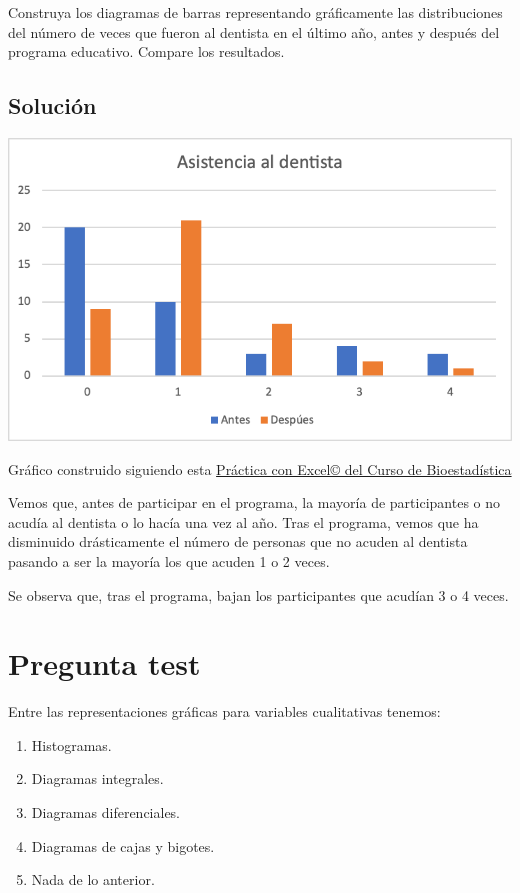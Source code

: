 \documentclass[
]{book}
\providecommand{\tightlist}{%
  \setlength{\itemsep}{0pt}\setlength{\parskip}{0pt}}
\begin{document}
Construya los diagramas de barras representando gráficamente las distribuciones del número de veces que fueron al dentista en el último año, antes y después del programa educativo. Compare los resultados.

\hypertarget{soluciuxf3n-5}{%
\subsection{Solución}\label{soluciuxf3n-5}}

\includegraphics[width=10.03in]{img/2_3}

Gráfico construido siguiendo esta \href{https://1fjmanzano.github.io/bioestadistica/diagramas-de-barras-y-sectores.html}{Práctica con Excel© del Curso de Bioestadística}

Vemos que, antes de participar en el programa, la mayoría de participantes o no acudía al dentista o lo hacía una vez al año. Tras el programa, vemos que ha disminuido drásticamente el número de personas que no acuden al dentista pasando a ser la mayoría los que acuden 1 o 2 veces.

Se observa que, tras el programa, bajan los participantes que acudían 3 o 4 veces.

\hypertarget{pregunta-test-28}{%
\section{Pregunta test}\label{pregunta-test-28}}

Entre las representaciones gráficas para variables cualitativas tenemos:

\begin{enumerate}
\def\labelenumi{\alph{enumi})}
\tightlist
\item
  Histogramas.
\item
  Diagramas integrales.
\item
  Diagramas diferenciales.
\item
  Diagramas de cajas y bigotes.
\item
  Nada de lo anterior.
\end{enumerate}
\end{document}
